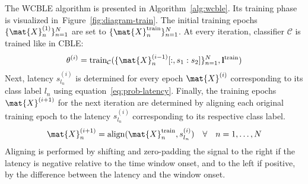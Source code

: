 The WCBLE algorithm is presented in Algorithm~\ref{alg:wcble}.
Its training phase is visualized in~Figure~\ref{fig:diagram-train}.
The initial training epochs $\{\mat{X}_n^{(1)}\}_{n=1}^N$ are set to $\{\mat{X}_n^\mathrm{train}\}_{n=1}^N$.
At every iteration, classifier $\mathcal{C}$ is trained like in CBLE:
\begin{equation}
  \theta^{(i)} =
  \mathrm{train}_\mathcal{C}(\{\mat{X}^{(i-1)}_n[:,s_1:s_2]\}_{n=1}^N,\mathbf{l}^\mathrm{train})
\end{equation}
Next, latency $s_{l_n}^{(i)}$ is determined for every epoch $\mat{X}^{(i)}$ corresponding
to its class label $l_n$ using equation~\ref{eq:prob-latency}.
Finally, the training epochs $\mat{X}^{(i+1)}$ for the next iteration are determined by aligning
each original training epoch to the latency $s_{l_n}^{(i)}$ corresponding to its respective class
label.
\begin{equation}
  \mat{X}^{(i+1)}_n = \mathrm{align}(\mat{X}_n^\mathrm{train}, s_{l_n}^{(i)}) \quad \forall \quad n=1,\ldots,N
\end{equation}
Aligning is performed by shifting and zero-padding the signal to the right if
the latency is negative relative to the time window onset, and to the left if
positive, by the difference between the latency and the window onset.
